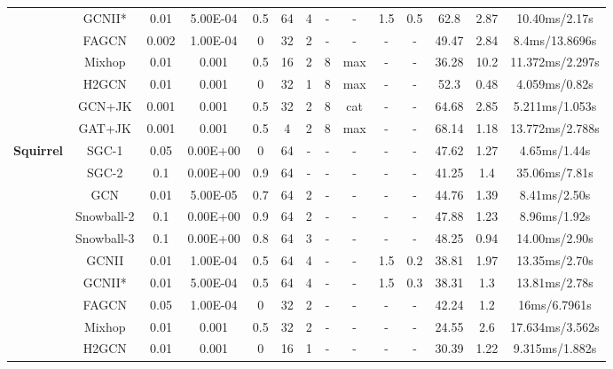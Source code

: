 \documentclass{article}
\newcommand{\0}{{\boldsymbol{0}}}
\newcommand{\6}{{\partial}}
\newcommand{\8}{{\infty}}
\newcommand{\4}{{\nabla}}
\begin{document}
\begin{table}[htbp]
{\begin{tabular}{c|c|cccccccccccc}
          & GCNII* & 0.01  & 5.00E-04 & 0.5   & 64    & 4     & -     & -     & 1.5   & 0.5   & 62.8  & 2.87  & 10.40ms/2.17s \\
          & FAGCN & 0.002 & 1.00E-04 & 0     & 32    & 2     & -     & -     & -     & -     & 49.47 & 2.84  & 8.4ms/13.8696s \\
          &  Mixhop & 0.01  & 0.001 & 0.5   & 16    & 2     & 8     & {max} & - & - & 36.28 & 10.2  & {11.372ms/2.297s} \\
          & H2GCN & 0.01  & 0.001 & 0     & 32    & 1     & 8     & {max} & - & - & 52.3  & 0.48  & {4.059ms/0.82s} \\
          & GCN+JK & 0.001 & 0.001 & 0.5   & 32    & 2     & 8     & {cat} & - & - & 64.68 & 2.85  & {5.211ms/1.053s} \\
          &  GAT+JK & 0.001 & 0.001 & 0.5   & 4     & 2     & 8     & {max} & - & - & 68.14 & 1.18  & {13.772ms/2.788s} \\
          \midrule
    \multirow{12}[0]{*}{\textbf{Squirrel}} & SGC-1 & 0.05  & 0.00E+00 & 0     & 64    & -     & -     & -     & -     & -     & 47.62 & 1.27  & 4.65ms/1.44s \\
          & SGC-2 & 0.1   & 0.00E+00 & 0.9   & 64    & -     & -     & -     & -     & -     & 41.25 & 1.4   & 35.06ms/7.81s \\
          & GCN   & 0.01  & 5.00E-05 & 0.7   & 64    & 2     & -     & -     & -     & -     & 44.76 & 1.39  & 8.41ms/2.50s \\
          & Snowball-2 & 0.1   & 0.00E+00 & 0.9   & 64    & 2     & -     & -     & -     & -     & 47.88 & 1.23  & 8.96ms/1.92s \\
          & Snowball-3 & 0.1   & 0.00E+00 & 0.8   & 64    & 3     & -     & -     & -     & -     & 48.25 & 0.94  & 14.00ms/2.90s \\
          & GCNII & 0.01  & 1.00E-04 & 0.5   & 64    & 4     & -     & -     & 1.5   & 0.2   & 38.81 & 1.97  & 13.35ms/2.70s \\
          & GCNII* & 0.01  & 5.00E-04 & 0.5   & 64    & 4     & -     & -     & 1.5   & 0.3   & 38.31 & 1.3   & 13.81ms/2.78s \\
          & FAGCN & 0.05  & 1.00E-04 & 0     & 32    & 2     & -     & -     & -     & -     & 42.24 & 1.2   & 16ms/6.7961s \\
          &  Mixhop & 0.01  & 0.001 & 0.5   & 32    & 2     & - & - & - & - & 24.55 & 2.6   & {17.634ms/3.562s} \\
          & H2GCN & 0.01  & 0.001 & 0     & 16    & 1     & - & - & - & - & 30.39 & 1.22  & {9.315ms/1.882s} \\

\end{tabular}}
\end{table}
\end{document}
